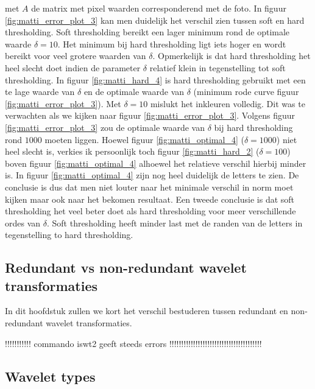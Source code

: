 met $A$ de matrix met pixel waarden corresponderend met de foto. In figuur \ref{fig:matti_error_plot_3} kan men duidelijk het verschil zien tussen soft en hard thresholding. Soft thresholding bereikt een lager minimum rond de optimale waarde $\delta = 10$. Het minimum bij hard thresholding ligt iets hoger en wordt bereikt voor veel grotere waarden van $\delta$. Opmerkelijk is dat hard thresholding het heel slecht doet indien de parameter $\delta$ relatief klein in tegenstelling tot soft thresholding. In figuur \ref{fig:matti_hard_4} is hard thresholding gebruikt met een te lage waarde van $\delta$ en de optimale waarde van $\delta$ (minimum rode curve figuur \ref{fig:matti_error_plot_3}). Met $\delta = 10$ mislukt het inkleuren volledig. Dit was te verwachten als we kijken naar figuur \ref{fig:matti_error_plot_3}. Volgens figuur \ref{fig:matti_error_plot_3} zou de optimale waarde van $\delta$ bij hard thresholding rond $1000$ moeten liggen. Hoewel figuur \ref{fig:matti_optimal_4} ($\delta = 1000$)  niet heel slecht is, verkies ik persoonlijk toch figuur \ref{fig:matti_hard_2} ($\delta = 100$) boven figuur \ref{fig:matti_optimal_4} alhoewel het relatieve verschil hierbij minder is. In figuur \ref{fig:matti_optimal_4} zijn nog heel duidelijk de letters te zien. De conclusie is dus dat men niet louter naar het minimale verschil in norm moet kijken maar ook naar het bekomen resultaat. Een tweede conclusie is dat soft thresholding het veel beter doet als hard thresholding voor meer verschillende ordes van $\delta$. Soft thresholding heeft minder last met de randen van de letters in tegenstelling to hard thresholding.



\subsection{Redundant vs non-redundant wavelet transformaties}

In dit hoofdstuk zullen we kort het verschil bestuderen tussen redundant en non-redundant wavelet transformaties.

!!!!!!!!!!! commando iswt2 geeft steeds errors !!!!!!!!!!!!!!!!!!!!!!!!!!!!!!!!!!!!!!!

\subsection{Wavelet types}

